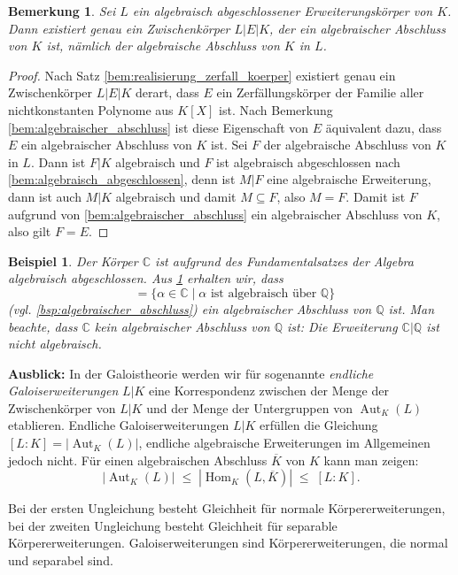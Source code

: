 \documentclass[a4paper, twoside, 11pt, ngerman]{report}
\newcommand{\CC}{\mathds C}
\newcommand{\QQ}{\mathds Q}
\DeclareMathOperator{\alg}{alg}
\DeclareMathOperator{\Aut}{Aut}
\DeclareMathOperator{\Hom}{Hom}
\DeclareMathOperator{\QQalg}{\QQ^{\alg}}
\theoremstyle{definistyle}
\newtheorem{bem}[satz]{Bemerkung}
\newtheorem{bsp}[satz]{Beispiel}
\theoremstyle{remark}
\begin{document}
\begin{bem}\label{bem:einbettung_alg_abschluss}
Sei $L$ ein algebraisch abgeschlossener Erweiterungskörper von $K$. Dann existiert genau ein Zwischenkörper $L|E|K$, der ein algebraischer Abschluss von $K$ ist, nämlich der algebraische Abschluss von $K$ in $L$.
\end{bem}

\begin{proof}
Nach Satz \ref{bem:realisierung_zerfall_koerper} existiert genau ein Zwischenkörper $L|E|K$ derart, dass $E$ ein Zerfällungskörper der Familie aller nichtkonstanten Polynome aus $K[X]$ ist. Nach Bemerkung \ref{bem:algebraischer_abschluss} ist diese Eigenschaft von $E$ äquivalent dazu, dass $E$ ein algebraischer Abschluss von $K$ ist. 
Sei $F$ der algebraische Abschluss von $K$ in $L$. Dann ist $F|K$ algebraisch und $F$ ist algebraisch abgeschlossen nach \ref{bem:algebraisch_abgeschlossen}, denn ist $M|F$
eine algebraische Erweiterung, dann ist auch $M|K$ algebraisch und damit $M\subseteq F$,
also $M=F$. Damit ist $F$ aufgrund von \ref{bem:algebraischer_abschluss} ein algebraischer Abschluss von $K$, also gilt $F=E$.
\end{proof}

\begin{bsp}\label{bsp:kp_alg_zahlen_in_C}
Der Körper $\mathbb{C}$ ist aufgrund des Fundamentalsatzes der Algebra algebraisch abgeschlossen. Aus \ref{bem:einbettung_alg_abschluss} erhalten wir, dass   
\[\QQalg = \{\alpha \in \mathbb{C} \mid \alpha \text{ ist algebraisch über } \QQ\}\] (vgl. \ref{bsp:algebraischer_abschluss}) ein algebraischer Abschluss von $\QQ$ ist. Man beachte, dass $\CC$
kein algebraischer Abschluss von $\QQ$ ist: Die Erweiterung $\CC|\QQ$ ist nicht algebraisch.
\end{bsp}

\noindent\textbf{Ausblick:} In der Galoistheorie werden wir für sogenannte \emph{endliche Galoiserweiterungen} $L|K$ eine Korrespondenz zwischen der Menge der Zwischenkörper von $L|K$ und der Menge der Untergruppen von $\Aut_K(L)$ etablieren. Endliche Galoiserweiterungen $L|K$ erfüllen die Gleichung $[L:K] = |\Aut_K(L)|$, endliche algebraische Erweiterungen im Allgemeinen jedoch nicht.
Für einen algebraischen Abschluss $\overline{K}$ von $K$ kann man zeigen:
\[
|\Aut_K(L)| \; \leq \; |\Hom_K(L,\overline{K})| \; \leq \; [L:K].
\]

Bei der ersten Ungleichung besteht Gleichheit für normale Körpererweiterungen,
bei der zweiten Ungleichung besteht Gleichheit für separable Körpererweiterungen. Galoiserweiterungen sind Körpererweiterungen, die normal und separabel sind.
\end{document}
